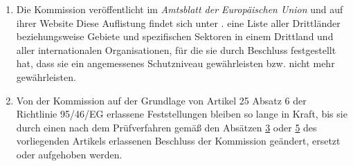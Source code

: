 \begin{enumerate}
  \item Die Kommission veröffentlicht im \emph{Amtsblatt der Europäischen Union} und auf ihrer Website\comment
   {Diese Auflistung findet sich unter \cite{adeq-list}.} eine Liste aller Drittländer beziehungsweise Gebiete und
   spezifischen Sektoren in einem Drittland und aller internationalen Organisationen, für die sie durch Beschluss
   festgestellt hat, dass sie ein angemessenes Schutzniveau gewährleisten bzw. nicht mehr gewährleisten. %
  \label{itm:45-8}

  \item Von der Kommission auf der Grundlage von Artikel 25 Absatz 6 der Richtlinie 95/46/EG erlassene Feststellungen
   bleiben so lange in Kraft, bis sie durch einen nach dem Prüfverfahren gemäß den Absätzen \hyperref[itm:45-3]
   {3} oder \hyperref[itm:45-5]{5} des vorliegenden Artikels erlassenen Beschluss der Kommission geändert, ersetzt oder
   aufgehoben werden.%
  \label{itm:45-9}

\end{enumerate}

